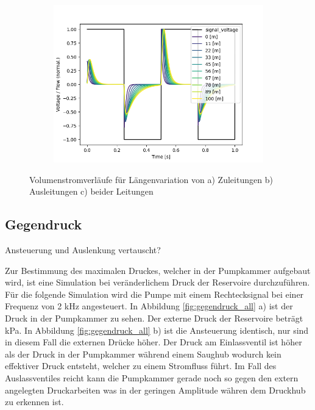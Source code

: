 \documentclass[fontsize=12pt, a4paper]{scrartcl}
\begin{document}
\begin{figure}[H]
\begin{subfigure}[H]{0.48\textwidth}
		\includegraphics[width=\textwidth, valign=t]{bilder/tubelength/tl_both_branch_multisweep_flow.png}
	\end{subfigure}
    \caption{Volumenstromverläufe für Längenvariation von a) Zuleitungen b) Ausleitungen c) beider Leitungen}
    \label{fig:sweepströme}
\end{figure}

\subsection{Gegendruck}

Ansteuerung und Auslenkung vertauscht?

Zur Bestimmung des maximalen Druckes, welcher in der Pumpkammer aufgebaut wird, ist eine Simulation bei veränderlichem Druck der Reservoire durchzuführen. Für die folgende Simulation wird die Pumpe mit einem Rechtecksignal bei einer Frequenz von 2 kHz angesteuert. In Abbildung \ref{fig:gegendruck_all} a) ist der Druck in der Pumpkammer zu sehen. Der externe Druck der Reservoire beträgt kPa. In Abbildung \ref{fig:gegendruck_all} b) ist die Ansteuerung identisch, nur sind in diesem Fall die externen Drücke höher. Der Druck am Einlassventil ist höher als der Druck in der Pumpkammer während einem Saughub wodurch kein effektiver Druck entsteht, welcher zu einem Stromfluss führt. Im Fall des Auslassventiles reicht kann die Pumpkammer gerade noch so gegen den extern angelegten Druckarbeiten was in der geringen Amplitude währen dem Druckhub zu erkennen ist.
\end{document}
